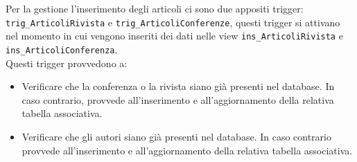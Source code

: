 Per la gestione l'inserimento degli articoli ci sono due appositi trigger: \texttt{trig\_ArticoliRivista} e 
\texttt{trig\_ArticoliConferenze}, questi trigger si attivano nel momento in cui vengono inseriti dei dati
nelle view \texttt{ins\_ArticoliRivista} e \texttt{ins\_ArticoliConferenza}. \\
Questi trigger provvedono a:
\begin{itemize}
    \item Verificare che la conferenza o la rivista siano già presenti nel database. In caso contrario,
          provvede all'inserimento e all'aggiornamento della relativa tabella associativa.
    \item Verificare che gli autori siano già presenti nel database. In caso contrario provvede all'inserimento
    e  all'aggiornamento della relativa tabella associativa.
\end{itemize}


